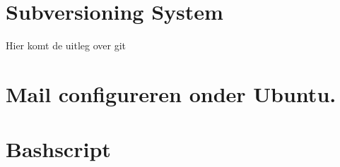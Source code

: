 \documentclass[11pt]{article}
\begin{document}
\part{Subversioning System ~\cite{SiteGit}}
Hier komt de uitleg over git 
\newpage
\part{Mail configureren onder Ubuntu.}
\newpage
\part{Bashscript}
\newpage
\listoffigures
\listoftables
 

\end{document}
